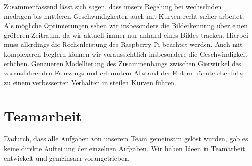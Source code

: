 \documentclass[10pt]{article}
\begin{document}
    Zusammenfassend lässt sich sagen, dass unsere Regelung bei wechselnden niedrigen bis mittleren Geschwindigkeiten auch mit Kurven recht sicher arbeitet.
    Als mögliche Optimierungen sehen wir insbesondere die Bilderkennung über einen größeren Zeitraum, da wir aktuell immer nur anhand eines Bildes tracken.
    Hierbei muss allerdings die Rechenleistung des Raspberry Pi beachtet werden.
    Auch mit komplexeren Reglern können wir voraussichtlich insbesondere die Geschwindigkeit erhöhen.
    Genaueren Modellierung des Zusammenhangs zwischen Gierwinkel des vorausfahrenden Fahrzeugs und erkanntem Abstand der Federn könnte ebenfalls zu einem verbesserten Verhalten in steilen Kurven führen.

\section{Teamarbeit}
    Dadurch, dass alle Aufgaben von unserem Team gemeinsam gelöst wurden, gab es keine direkte Aufteilung der einzelnen Aufgaben.
    Wir haben Ideen in Teamarbeit entwickelt und gemeinsam vorangetrieben.
\end{document}
